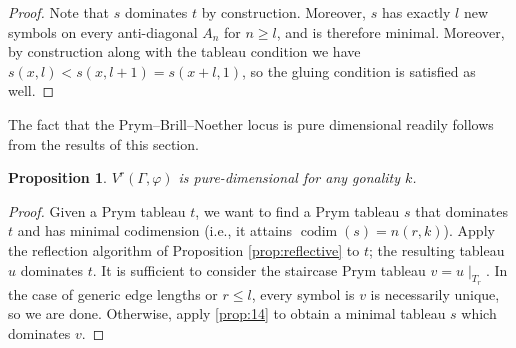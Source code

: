 \documentclass[11pt,reqno]{amsart}
\newcommand*{\restrict}[1]{{\mid}_{#1}}
\DeclareMathOperator{\codim}{codim}
\theoremstyle{definition}
\theoremstyle{problem}
\theoremstyle{plain}
\newtheorem{proposition}[definition]{Proposition}
\theoremstyle{remark}
\theoremstyle{theorem}
\numberwithin{equation}{section}
\numberwithin{figure}{section}
\begin{document}
\begin{proof}
    Note that $s$ dominates $t$ by construction. Moreover, $s$ has
  exactly $l$ new symbols on every anti-diagonal $A_n$ for $n\geq l$,
  and is therefore minimal.  Moreover, by construction along with the tableau condition we have $s(x,l)< s(x,l+1)=s(x+l,1)$, so the gluing condition is satisfied as well.
\end{proof}

The fact that the Prym--Brill--Noether  locus is pure dimensional readily follows from the results of this section. 

\begin{proposition}\label{thm:pure-dim}
	$V^r(\Gamma,\varphi)$ is pure-dimensional for any gonality $k$.
\end{proposition}

\begin{proof}
	Given a Prym tableau $t$, we want to find a Prym tableau $s$ that
	dominates $t$ and has minimal codimension (i.e., it attains
	$\codim(s) = n(r,k)$).  Apply the reflection algorithm of
	Proposition \ref{prop:reflective} to $t$; the resulting tableau $u$
	dominates $t$.
	It is sufficient to consider the staircase Prym tableau
	$v = u\restrict{T_r}$.  In the case of generic edge lengths or
	$r \leq l$, every symbol is $v$ is necessarily unique, so we are
	done.  Otherwise, apply \cref{prop:14} to obtain a minimal tableau
	$s$ which dominates $v$.
\end{proof}
\end{document}
